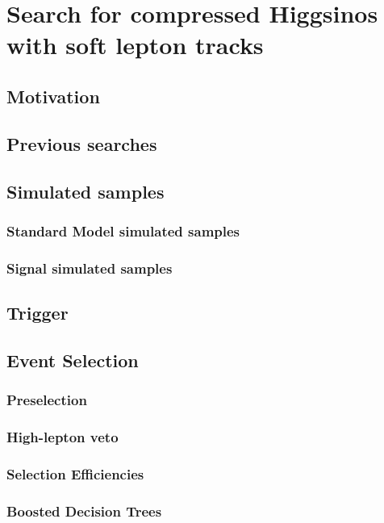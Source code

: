 \chapter{Search for compressed Higgsinos  with soft
lepton tracks}

\section{Motivation}

\section{Previous searches}




\section{Simulated samples}
\subsection{Standard Model simulated samples}
\label{sec:sm-mc}
\subsection{Signal simulated samples}
\label{signal-simulation}




\section{Trigger}
\label{sec:trigger}

\section{Event Selection}

\subsection{Preselection}
\subsection{High-\pt lepton veto}
\subsection{Selection Efficiencies}
\subsection{Boosted Decision Trees}

